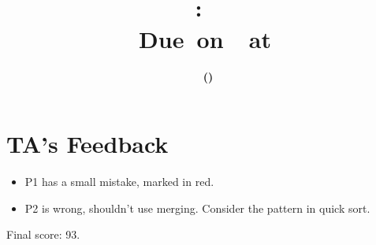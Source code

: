 \documentclass[11pt,letterpaper,titlepage,en-US]{article}
\title{
    \vspace{2in}
    \textmd{\textbf{\hmwkClassName \\\hmwkClass:\ \hmwkTitle}}\\
    \normalsize\vspace{0.1in}\small{Due\ on\ \DTMusedate{DueDate}\ at \DTMusetime{DueDate} }\\
    \vspace{0.1in}\large{\textit{\hmwkClassInstructor}}
    \vspace{3in}
}
\author{\textbf{\hmwkAuthorName\ \footnotesize{(\hmwkAuthorNetID)}} \\  \hmwkAuthorUTDEmail}
\date{}
\begin{document}
\maketitle


\tableofcontents

\pagebreak
{}



\pagebreak

\pagebreak


\section*{TA's Feedback}
\begin{itemize}
    \item P1 has a small mistake, marked in red.
    \item P2 is wrong, shouldn't use merging. Consider the pattern in quick sort.
\end{itemize}
Final score: 93.
\end{document}
